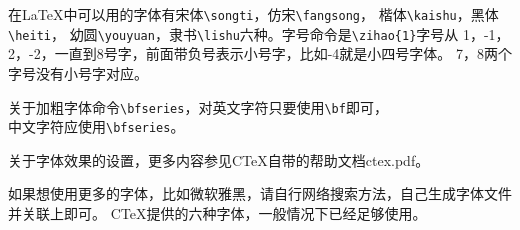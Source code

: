 在\LaTeX 中可以用的字体有{\songti 宋体}\verb+\songti+，{\fangsong 仿宋}\verb+\fangsong+，
{\kaishu 楷体}\verb+\kaishu+，{\heiti 黑体}\verb+\heiti+，
{\youyuan 幼圆}\verb+\youyuan+，{\lishu 隶书}\verb+\lishu+六种。字号命令是\verb+\zihao{1}+字号从
1，-1，2，-2，一直到8号字，前面带负号表示小号字，比如-4就是小四号字体。
7，8两个字号没有小号字对应。

关于加粗字体命令\verb+\bfseries+，对英文字符只要使用\verb+\bf+即可，\\
中文字符应使用\verb+\bfseries+。

关于字体效果的设置，更多内容参见CTeX自带的帮助文档ctex.pdf。

如果想使用更多的字体，比如微软雅黑，请自行网络搜索方法，自己生成字体文件并关联上即可。
CTeX提供的六种字体，一般情况下已经足够使用。


